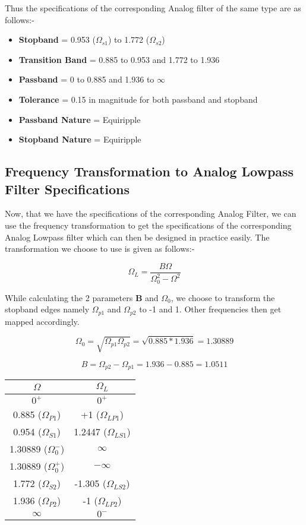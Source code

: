 \documentclass[12pt]{article}
\begin{document}
\noindent

Thus the specifications of the corresponding Analog filter of the same type are as follows:-

\begin{itemize}
    \item \textbf{Stopband} = 0.953 ($\Omega_{s1}$) to 1.772 ($\Omega_{s2}$)
    \item \textbf{Transition Band} = 0.885 to 0.953 and 1.772 to 1.936
    \item \textbf{Passband} = 0 to 0.885 and 1.936 to $\infty$
    \item\textbf{Tolerance} = 0.15 in magnitude for both passband and stopband
    \item \textbf{Passband Nature} = Equiripple
    \item \textbf{Stopband Nature} = Equiripple
\end{itemize}

\subsection{Frequency Transformation to Analog Lowpass Filter Specifications}

Now, that we have the specifications of the corresponding Analog Filter, we can use the frequency transformation to get the specifications of the corresponding Analog Lowpass filter which can then be designed in practice easily. The transformation we choose to use is given as follows:-

\[\Omega_{L} = \frac{B\Omega}{\Omega_{0}^2 - \Omega^2}\]

While calculating the 2 parameters \textbf{B} and \textbf{$\Omega_{0}$}, we choose to transform the stopband edges namely $\Omega_{p1}$ and $\Omega_{p2}$ to -1 and 1. Other frequencies then get mapped accordingly.

\[\Omega_{0} = \sqrt{\Omega_{p1}\Omega_{p2}} = \sqrt{0.885*1.936} = 1.30889\]

\[B = \Omega_{p2} - \Omega_{p1} = 1.936 - 0.885 = 1.0511\]

\begin{center}
    \begin{tabular}{|c|c|}
     \hline
    $\Omega$ & $\Omega_{L}$ \\ \hline
    $0^+$ & $0^+$ \\ \hline
    0.885 ($\Omega_{P1}$) & +1 ($\Omega_{LP1}$)\\ \hline
    0.954 ($\Omega_{S1}$) & 1.2447 ($\Omega_{LS1}$) \\ \hline
    1.30889 ($\Omega_{0}^-$) & $\infty$ \\ \hline
    1.30889 ($\Omega_{0}^+$) & $-\infty$ \\ \hline
    1.772 ($\Omega_{S2}$) & -1.305 ($\Omega_{LS2}$) \\ \hline
    1.936 ($\Omega_{P2}$) & -1 ($\Omega_{LP2}$)\\ \hline
    $\infty$ & $0^-$ \\ \hline
    \end{tabular}
\end{center}
\end{document}
